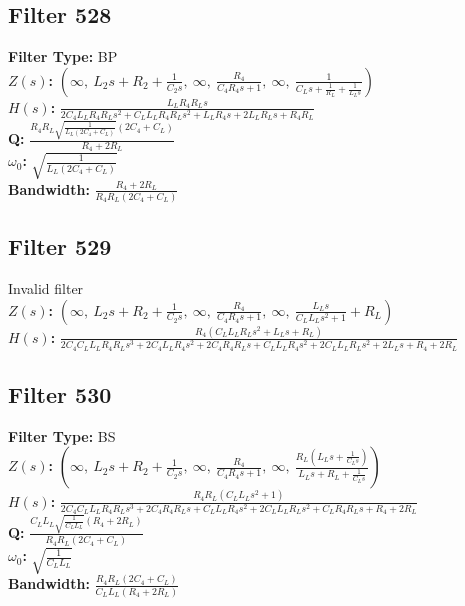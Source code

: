 \documentclass{article}
\begin{document}
\subsection*{Filter 528}
\textbf{Filter Type:} BP \\ 
\textbf{$Z(s)$:} $\left( \infty, \  L_{2} s + R_{2} + \frac{1}{C_{2} s}, \  \infty, \  \frac{R_{4}}{C_{4} R_{4} s + 1}, \  \infty, \  \frac{1}{C_{L} s + \frac{1}{R_{L}} + \frac{1}{L_{L} s}}\right)$ \\ 
\textbf{$H(s)$:} $\frac{L_{L} R_{4} R_{L} s}{2 C_{4} L_{L} R_{4} R_{L} s^{2} + C_{L} L_{L} R_{4} R_{L} s^{2} + L_{L} R_{4} s + 2 L_{L} R_{L} s + R_{4} R_{L}}$ \\ 
\textbf{Q:} $\frac{R_{4} R_{L} \sqrt{\frac{1}{L_{L} \left(2 C_{4} + C_{L}\right)}} \left(2 C_{4} + C_{L}\right)}{R_{4} + 2 R_{L}}$ \\ 
\textbf{$\omega_0$:} $\sqrt{\frac{1}{L_{L} \left(2 C_{4} + C_{L}\right)}}$ \\ 
\textbf{Bandwidth:} $\frac{R_{4} + 2 R_{L}}{R_{4} R_{L} \left(2 C_{4} + C_{L}\right)}$ \\ 
\subsection*{Filter 529}
Invalid filter \\ 
\textbf{$Z(s)$:} $\left( \infty, \  L_{2} s + R_{2} + \frac{1}{C_{2} s}, \  \infty, \  \frac{R_{4}}{C_{4} R_{4} s + 1}, \  \infty, \  \frac{L_{L} s}{C_{L} L_{L} s^{2} + 1} + R_{L}\right)$ \\ 
\textbf{$H(s)$:} $\frac{R_{4} \left(C_{L} L_{L} R_{L} s^{2} + L_{L} s + R_{L}\right)}{2 C_{4} C_{L} L_{L} R_{4} R_{L} s^{3} + 2 C_{4} L_{L} R_{4} s^{2} + 2 C_{4} R_{4} R_{L} s + C_{L} L_{L} R_{4} s^{2} + 2 C_{L} L_{L} R_{L} s^{2} + 2 L_{L} s + R_{4} + 2 R_{L}}$ \\ 
\subsection*{Filter 530}
\textbf{Filter Type:} BS \\ 
\textbf{$Z(s)$:} $\left( \infty, \  L_{2} s + R_{2} + \frac{1}{C_{2} s}, \  \infty, \  \frac{R_{4}}{C_{4} R_{4} s + 1}, \  \infty, \  \frac{R_{L} \left(L_{L} s + \frac{1}{C_{L} s}\right)}{L_{L} s + R_{L} + \frac{1}{C_{L} s}}\right)$ \\ 
\textbf{$H(s)$:} $\frac{R_{4} R_{L} \left(C_{L} L_{L} s^{2} + 1\right)}{2 C_{4} C_{L} L_{L} R_{4} R_{L} s^{3} + 2 C_{4} R_{4} R_{L} s + C_{L} L_{L} R_{4} s^{2} + 2 C_{L} L_{L} R_{L} s^{2} + C_{L} R_{4} R_{L} s + R_{4} + 2 R_{L}}$ \\ 
\textbf{Q:} $\frac{C_{L} L_{L} \sqrt{\frac{1}{C_{L} L_{L}}} \left(R_{4} + 2 R_{L}\right)}{R_{4} R_{L} \left(2 C_{4} + C_{L}\right)}$ \\ 
\textbf{$\omega_0$:} $\sqrt{\frac{1}{C_{L} L_{L}}}$ \\ 
\textbf{Bandwidth:} $\frac{R_{4} R_{L} \left(2 C_{4} + C_{L}\right)}{C_{L} L_{L} \left(R_{4} + 2 R_{L}\right)}$ \\ 
\end{document}
